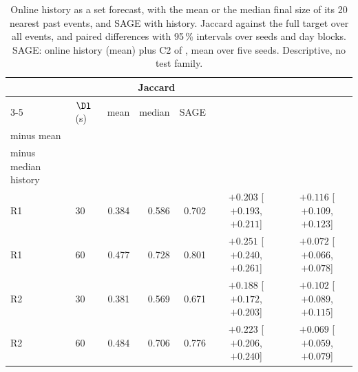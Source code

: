\begin{table}[h]
\footnotesize
\centering
\caption{Online history as a set forecast, with the mean or the median final size of its 20 nearest past events, and SAGE with history. Jaccard against the full target over all events, and paired differences with 95\,\% intervals over seeds and day blocks. SAGE: online history (mean) plus C2 of , mean over five seeds. Descriptive, no test family.}
\label{tab:history-size}
\setlength{\tabcolsep}{4pt}
\begin{tabular}{@{}llrrrcc@{}}
\toprule
 & & \multicolumn{3}{c}{Jaccard} & & \\
\cmidrule(lr){3-5}
 & $\Dl$ (s) & mean & median & SAGE & \hd{median\\minus mean} & \hd{SAGE with history\\minus median history} \\
\midrule
R1 & 30 & 0.384 & 0.586 & 0.702 & $+0.203$ [$+0.193$, $+0.211$] & $+0.116$ [$+0.109$, $+0.123$] \\
R1 & 60 & 0.477 & 0.728 & 0.801 & $+0.251$ [$+0.240$, $+0.261$] & $+0.072$ [$+0.066$, $+0.078$] \\
R2 & 30 & 0.381 & 0.569 & 0.671 & $+0.188$ [$+0.172$, $+0.203$] & $+0.102$ [$+0.089$, $+0.115$] \\
R2 & 60 & 0.484 & 0.706 & 0.776 & $+0.223$ [$+0.206$, $+0.240$] & $+0.069$ [$+0.059$, $+0.079$] \\
\bottomrule
\end{tabular}
\end{table}

